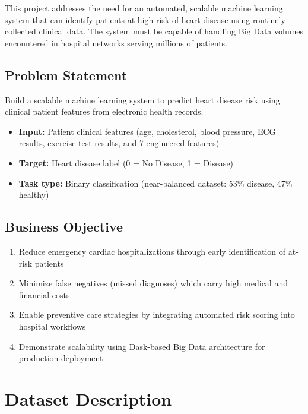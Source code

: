 \documentclass[12pt,a4paper]{article}
\begin{document}
This project addresses the need for an automated, scalable machine learning system that can identify patients at high risk of heart disease using routinely collected clinical data. The system must be capable of handling Big Data volumes encountered in hospital networks serving millions of patients.

\subsection{Problem Statement}

Build a scalable machine learning system to predict heart disease risk using clinical patient features from electronic health records.

\begin{itemize}
    \item \textbf{Input:} Patient clinical features (age, cholesterol, blood pressure, ECG results, exercise test results, and 7 engineered features)
    \item \textbf{Target:} Heart disease label (0 = No Disease, 1 = Disease)
    \item \textbf{Task type:} Binary classification (near-balanced dataset: 53\% disease, 47\% healthy)
\end{itemize}

\subsection{Business Objective}

\begin{enumerate}
    \item Reduce emergency cardiac hospitalizations through early identification of at-risk patients
    \item Minimize false negatives (missed diagnoses) which carry high medical and financial costs
    \item Enable preventive care strategies by integrating automated risk scoring into hospital workflows
    \item Demonstrate scalability using Dask-based Big Data architecture for production deployment
\end{enumerate}

\section{Dataset Description}
\end{document}
